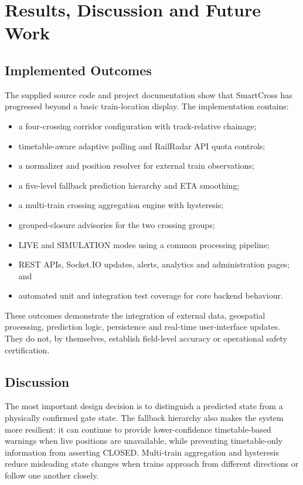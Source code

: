 \documentclass[11pt,a4paper]{report}
\begin{document}
\chapter{Results, Discussion and Future Work}
\section{Implemented Outcomes}
The supplied source code and project documentation show that SmartCross has progressed beyond a basic train-location display. The implementation contains:
\begin{itemize}
  \item a four-crossing corridor configuration with track-relative chainage;
  \item timetable-aware adaptive polling and RailRadar API quota controls;
  \item a normalizer and position resolver for external train observations;
  \item a five-level fallback prediction hierarchy and ETA smoothing;
  \item a multi-train crossing aggregation engine with hysteresis;
  \item grouped-closure advisories for the two crossing groups;
  \item LIVE and SIMULATION modes using a common processing pipeline;
  \item REST APIs, Socket.IO updates, alerts, analytics and administration pages; and
  \item automated unit and integration test coverage for core backend behaviour.
\end{itemize}

These outcomes demonstrate the integration of external data, geospatial processing, prediction logic, persistence and real-time user-interface updates. They do not, by themselves, establish field-level accuracy or operational safety certification.

\section{Discussion}
The most important design decision is to distinguish a predicted state from a physically confirmed gate state. The fallback hierarchy also makes the system more resilient: it can continue to provide lower-confidence timetable-based warnings when live positions are unavailable, while preventing timetable-only information from asserting CLOSED. Multi-train aggregation and hysteresis reduce misleading state changes when trains approach from different directions or follow one another closely.
\end{document}
